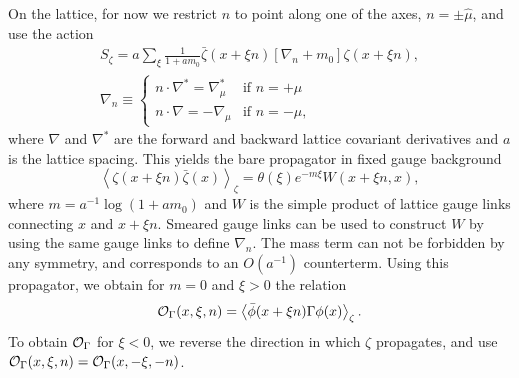 On the lattice, for now we restrict $n$ to point along one of the
axes, $n=\pm\hat\mu$, and use the action
\begin{equation}
\begin{gathered}
  S_\zeta = a\sum_\xi\frac{1}{1+am_0}\bar\zeta(x+\xi n)\left[\nabla_n+m_0\right]\zeta(x+\xi n),\\
\nabla_n\equiv\begin{cases}
n\cdot\nabla^* = \nabla^*_\mu & \text{if }n=+\hat\mu \\
n\cdot\nabla = -\nabla_\mu & \text{if }n=-\hat\mu,
\end{cases}
\end{gathered}
\end{equation}
where $\nabla$ and $\nabla^*$ are the forward and backward lattice
covariant derivatives and $a$ is the lattice spacing. This yields the
bare propagator in fixed gauge background
\begin{equation}
  \left\langle \zeta(x+\xi n)\bar\zeta(x)\right\rangle_\zeta = \theta(\xi)e^{-m\xi}W(x+\xi n,x),
\end{equation}
where $m=a^{-1}\log(1+am_0)$ and $W$ is the simple product of lattice
gauge links connecting $x$ and $x+\xi n$. Smeared gauge links can be
used to construct $W$ by using the same gauge links to define
$\nabla_n$. The mass term can not be forbidden by any symmetry, and
corresponds to an $O(a^{-1})$ counterterm. Using this propagator, we
obtain for $m=0$ and $\xi>0$ the relation
\begin{equation}
  \mathcal{O}_\Gamma(x,\xi,n) = \left\langle \bar\phi(x+\xi n)\Gamma \phi(x) \right\rangle_\zeta.
\end{equation}
To obtain $\mathcal{O}_\Gamma$ for $\xi<0$, we reverse the direction in which
$\zeta$ propagates, and use
$\mathcal{O}_\Gamma(x,\xi,n)=\mathcal{O}_\Gamma(x,-\xi,-n)$.

